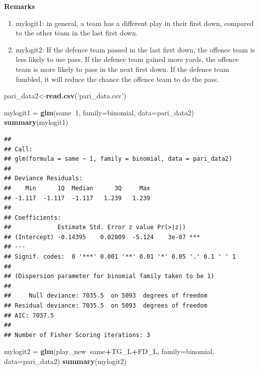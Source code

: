 \documentclass[]{book}
\newenvironment{Shaded}{\begin{snugshade}}{\end{snugshade}}
\newcommand{\KeywordTok}[1]{\textcolor[rgb]{0.13,0.29,0.53}{\textbf{#1}}}
\newcommand{\DataTypeTok}[1]{\textcolor[rgb]{0.13,0.29,0.53}{#1}}
\newcommand{\DecValTok}[1]{\textcolor[rgb]{0.00,0.00,0.81}{#1}}
\newcommand{\StringTok}[1]{\textcolor[rgb]{0.31,0.60,0.02}{#1}}
\newcommand{\OperatorTok}[1]{\textcolor[rgb]{0.81,0.36,0.00}{\textbf{#1}}}
\newcommand{\NormalTok}[1]{#1}
\begin{document}
\textbf{Remarks}

\begin{enumerate}
\def\labelenumi{\arabic{enumi}.}
\item
  mylogit1: in general, a team has a different play in their first down,
  compared to the other team in the last first down.
\item
  mylogit2: If the defence team passed in the last first down, the
  offence team is less likely to use pass. If the defence team gained
  more yards, the offence team is more likely to pass in the next first
  down. If the defence team fumbled, it will reduce the chance the
  offence team to do the pass.
\end{enumerate}

\begin{Shaded}
\begin{Highlighting}[]
\NormalTok{pari_data2<-}\KeywordTok{read.csv}\NormalTok{(}\StringTok{'pari_data.csv'}\NormalTok{)}

\NormalTok{mylogit1 =}\StringTok{ }\KeywordTok{glm}\NormalTok{(same}\OperatorTok{~}\DecValTok{1}\NormalTok{, }\DataTypeTok{family=}\NormalTok{binomial, }\DataTypeTok{data=}\NormalTok{pari_data2)}
\KeywordTok{summary}\NormalTok{(mylogit1)}
\end{Highlighting}
\end{Shaded}

\begin{verbatim}
## 
## Call:
## glm(formula = same ~ 1, family = binomial, data = pari_data2)
## 
## Deviance Residuals: 
##    Min      1Q  Median      3Q     Max  
## -1.117  -1.117  -1.117   1.239   1.239  
## 
## Coefficients:
##             Estimate Std. Error z value Pr(>|z|)    
## (Intercept) -0.14395    0.02809  -5.124    3e-07 ***
## ---
## Signif. codes:  0 '***' 0.001 '**' 0.01 '*' 0.05 '.' 0.1 ' ' 1
## 
## (Dispersion parameter for binomial family taken to be 1)
## 
##     Null deviance: 7035.5  on 5093  degrees of freedom
## Residual deviance: 7035.5  on 5093  degrees of freedom
## AIC: 7037.5
## 
## Number of Fisher Scoring iterations: 3
\end{verbatim}

\begin{Shaded}
\begin{Highlighting}[]
\NormalTok{mylogit2 =}\StringTok{ }\KeywordTok{glm}\NormalTok{(play_new}\OperatorTok{~}\NormalTok{same}\OperatorTok{+}\NormalTok{TG_L}\OperatorTok{+}\NormalTok{FD_L, }\DataTypeTok{family=}\NormalTok{binomial, }\DataTypeTok{data=}\NormalTok{pari_data2)}
\KeywordTok{summary}\NormalTok{(mylogit2)}
\end{Highlighting}
\end{Shaded}
\end{document}
